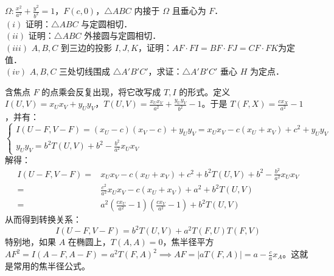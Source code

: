 \begin{exercise}[费尔巴哈，反演]
$\Omega:\frac{x^{2}}{a^{2}}+\frac{y^{2}}{b^{2}}=1$，$F(c,0)$，$\triangle ABC$ 内接于 $\Omega$ 且垂心为 $F$．\\
$(i)$ 证明：$\triangle ABC$ 与定圆相切．\\
$(ii)$ 证明：$\triangle ABC$ 外接圆与定圆相切．\\
$(iii)$ $A,B,C$ 到三边的投影 $I,J,K$，证明：$AF\cdot FI=BF\cdot FJ=CF\cdot FK $为定值．\\
$(iv)$ $A,B,C$ 三处切线围成 $\triangle A'B'C'$，求证：$\triangle A'B'C'$ 垂心 $H$ 为定点．
\end{exercise}
\begin{solution}
含焦点 $F$ 的点乘会反复出现，将它改写成 $T,I$ 的形式。定义 $I(U,V) = x_U x_V + y_U y_V$，$T(U,V) = \frac{x_U x_V}{a^2} + \frac{y_U y_V}{b^2} - 1$。于是 $T(F,X) = \frac{c x_X}{a^2} - 1$，并有：
\[
\begin{cases}I(U-F, V-F) = (x_U - c)(x_V - c) + y_U y_V = x_U x_V - c(x_U + x_V) + c^2 + y_U y_V \\y_U y_V = b^2 T(U,V) + b^2 - \frac{b^2}{a^2}x_U x_V
\end{cases}
\]
解得：
\begin{align*}
I(U-F, V-F) =& x_U x_V - c(x_U + x_V)+c^2 +b^2 T(U,V) + b^2 - \frac{b^2}{a^2} x_U x_V \\
=&\frac{c^2}{a^2} x_U x_V - c(x_U + x_V) + a^2 + b^2 T(U,V)\\
=&a^2 \left( \frac{c x_U}{a^2} - 1 \right) \left( \frac{c x_V}{a^2} - 1 \right)+ b^2 T(U,V)
\end{align*}
从而得到转换关系：\[{I(U-F, V-F) = b^2 T(U,V) + a^2 T(F,U) T(F,V)}\]
特别地，如果 $A$ 在椭圆上，$T(A,A)=0$，焦半径平方 $AF^2 = I(A-F, A-F) = a^2 T(F,A)^2 \implies AF = |a T(F,A)| = a - \frac{c}{a}x_A$。这就是常用的焦半径公式。


\end{solution}
